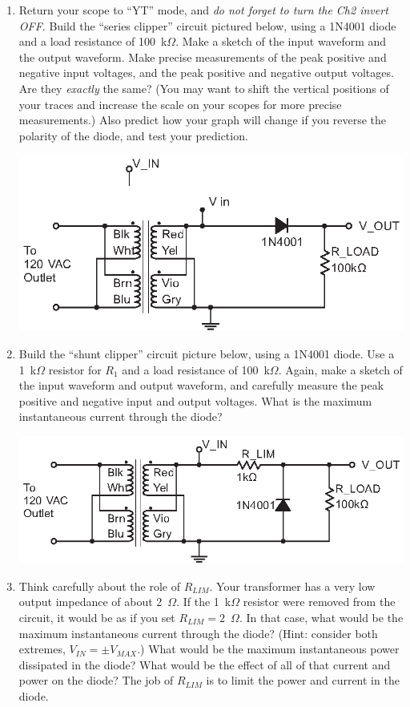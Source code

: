 \begin{enumerate}[wide]
\item Return your scope to ``YT'' mode, and \textit{do not forget to turn the Ch2 invert OFF}.  Build the ``series clipper'' circuit pictured below, using a 1N4001 diode and a load resistance of 100~k$\Omega$.  Make a sketch of the input waveform and the output waveform.  Make precise measurements of the peak positive and negative input voltages, and the peak positive and negative output voltages.  Are they \textit{exactly} the same?  (You may want to shift the vertical positions of your traces and increase the scale on your scopes for more precise measurements.)  Also predict how your graph will change if you reverse the polarity of the diode, and test your prediction.
\begin{center}
\includegraphics{diodes/series_clipper.eps}
\end{center}

\item Build the ``shunt clipper'' circuit picture below, using a 1N4001 diode.  Use a 1~k$\Omega$ resistor for $R_1$ and a load resistance of 100~k$\Omega$.  Again, make a sketch of the input waveform and output waveform, and carefully measure the peak positive and negative input and output voltages.  What is the maximum instantaneous current through the diode?  \label{part_shunt_clipper}
\begin{center}
\includegraphics{diodes/shunt_clipper.eps}
\end{center} 
\item Think carefully about the role of $R_{LIM}$.  Your transformer has a very low output impedance of about 2~$\Omega$.  If the 1~k$\Omega$ resistor were removed from the circuit, it would be as if you set $R_{LIM} = 2$~$\Omega$.  In that case, what would be the maximum instantaneous current through the diode?  (Hint: consider both extremes, $V_{IN} = \pm V_{MAX}$.) What would be the maximum instantaneous power dissipated in the diode?  What would be the effect of all of that current and power on the diode?  The job of $R_{LIM}$ is to limit the power and current in the diode.


\end{enumerate}

